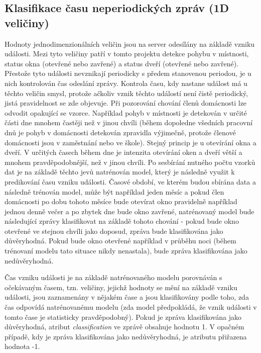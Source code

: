 \subsection{Klasifikace času neperiodických zpráv (1D veličiny)} \label{subsec:1D_quantities}
Hodnoty jednodimenzionálních veličin jsou na server odesílány na základě vzniku události. Mezi tyto veličiny patří v tomto projektu detekce pohybu v místnosti, status okna (otevřené nebo zavřené) a status dveří (otevřené nebo zavřené). Přestože tyto události nevznikají periodicky s předem stanovenou periodou, je u nich kontrolován čas odeslání zprávy. Kontrola času, kdy nastane událost má u těchto veličin smysl, protože ačkoliv vznik těchto událostí není čistě periodický, jistá pravidelnost se zde objevuje. Při pozorování chování členů domácnosti lze odvodit opakující se vzorce. Například pohyb v místnosti je detekován v určité části dne mnohem častěji než v jinou chvíli (během dopoledne všedních pracovní dnů je pohyb v domácnosti detekován zpravidla výjimečně, protože členové domácnosti jsou v zaměstnání nebo ve škole). Stejný princip je u otevírání okna a dveří. V určitých časech během dne je intenzita otevírání oken a dveří větší a mnohem pravděpodobnější, než v jinou chvíli. Po sesbírání nutného počtu vzorků dat je na základě těchto jevů natrénován model, který je následně využit k predikování času vzniku události. Časové období, ve kterém budou sbírána data a následně trénován model, může být například jeden měsíc a pokud člen domácnosti po dobu tohoto měsíce bude otevírat okno pravidelně například jednou denně večer a po zbytek dne bude okno zavřené, natrénovaný model bude následující zprávy klasifikovat na základě tohoto chování - pokud bude okno otevřené ve stejnou chvíli jako doposud, zpráva bude klasifikována jako důvěryhodná. Pokud bude okno otevřené například v průběhu noci (během trénovaní modelu tato situace nikdy nenastala), bude zpráva klasifikována jako nedůvěryhodná.\par
Čas vzniku události je na základě natrénovaného modelu porovnáván s očekávaným časem, tzn. veličiny, jejichž hodnoty se mění na základě vzniku události, jsou zaznamenány v nějakém čase a jsou klasifikovány podle toho, zda čas odpovídá natrénovanému modelu (zda model předpokládá, že vznik události v tomto čase je statisticky pravděpodobný). Pokud je zpráva klasifikována jako důvěryhodná, atribut \textit{classification} ve zprávě obsahuje hodnotu 1. V opačném případě, kdy je zpráva klasifikována jako nedůvěryhodná, je atributu přiřazena hodnota -1. 

